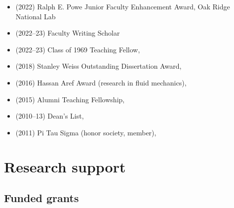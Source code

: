 \begin{itemize}
    \item (2022) Ralph E. Powe Junior Faculty Enhancement Award, Oak Ridge National Lab
    \item (2022--23) \GT Faculty Writing Scholar
    \item (2022--23) Class of 1969 Teaching Fellow, \GIT
    \item (2018) Stanley Weiss Outstanding Dissertation Award, \UIUC
    \item (2016) Hassan Aref Award (research in fluid mechanics), \UIUC
    \item (2015) Alumni Teaching Fellowship, \UIUC
    \item (2010--13) Dean's List, \UMD
    \item (2011) Pi Tau Sigma (honor society, member), \UMD
\end{itemize}

\section{Research support}



\subsection{Funded grants}

